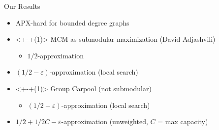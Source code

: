\begin{frame}[<+>]{Our Results}
\begin{itemize}
  	\item APX-hard for bounded degree graphs 
	\item<+-+(1)> MCM as submodular maximization (David Adjashvili) 
		\begin{itemize}
		  \item $1/2$-approximation 
		\end{itemize}
	\item $(1/2 - \varepsilon)$-approximation (local search)
	\item<+-+(1)> Group Carpool (not submodular)
		\begin{itemize}
			\item $(1/2 - \varepsilon)$-approximation (local search)
		\end{itemize}
	\item $1/2 + 1/2C - \varepsilon$-approximation (unweighted, $C$ = max capacity)
\end{itemize}
\end{frame}